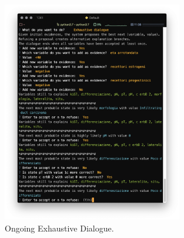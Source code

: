 \begin{figure}[htbp]
\centerline{\includegraphics[width=0.7\textwidth]{results/images/sw_5_exhaustive_dialogue}}
\caption{Ongoing Exhaustive Dialogue.}
\label{fig:sw_5_exhaustive_dialogue}
\end{figure}

